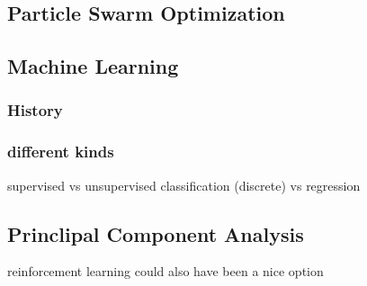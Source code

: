 \subsection{Particle Swarm Optimization}
\subsection{Machine Learning}
\subsubsection{History}
\subsubsection{different kinds} 
supervised vs unsupervised
classification (discrete) vs regression
\subsection{Princlipal Component Analysis}
reinforcement learning could also have been a nice option
